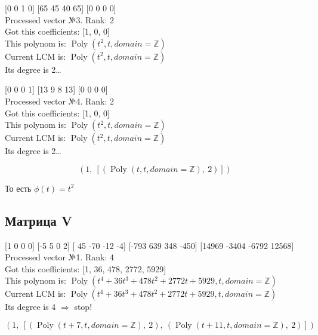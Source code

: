 \documentclass[12pt, a4paper]{article}
\begin{document}
    [0 0 1 0] [65 45 40 65] [0 0 0 0] \\
    Processed vector №3. Rank: 2\\
    Got this coefficients: [1, 0, 0]\\
    This polynom is: $\operatorname{Poly}{\left( t^{2}, t, domain=\mathbb{Z} \right)}$\\
    Current LCM is: $\operatorname{Poly}{\left( t^{2}, t, domain=\mathbb{Z} \right)}$\\
    Its degree is 2…

    [0 0 0 1] [13  9  8 13] [0 0 0 0] \\
    Processed vector №4. Rank: 2\\
    Got this coefficients: [1, 0, 0]\\
    This polynom is: $\operatorname{Poly}{\left( t^{2}, t, domain=\mathbb{Z} \right)}$\\
    Current LCM is: $\operatorname{Poly}{\left( t^{2}, t, domain=\mathbb{Z} \right)}$\\
    Its degree is 2…

    \begin{equation}\left( 1, \  \left[ \left( \operatorname{Poly}{\left( t, t, domain=\mathbb{Z} \right)}, \  2\right)\right]\right)\end{equation}

    То есть $\phi(t) = t^2$

    \subsection{Матрица V}

    [1 0 0 0] [-5  5  0  2] [ 45 -70 -12  -4] [-793  639  348 -450] [14969 -3404 -6792 12568] \\
    Processed vector №1. Rank: 4\\
    Got this coefficients: [1, 36, 478, 2772, 5929]\\
    This polynom is: $\operatorname{Poly}{\left( t^{4} + 36 t^{3} + 478 t^{2} + 2772 t + 5929, t, domain=\mathbb{Z} \right)}$\\
    Current LCM is: $\operatorname{Poly}{\left( t^{4} + 36 t^{3} + 478 t^{2} + 2772 t + 5929, t, domain=\mathbb{Z} \right)}$\\
    Its degree is 4 $\Rightarrow$ stop!

    \begin{equation}\left( 1, \  \left[ \left( \operatorname{Poly}{\left( t + 7, t, domain=\mathbb{Z} \right)}, \  2\right), \  \left( \operatorname{Poly}{\left( t + 11, t, domain=\mathbb{Z} \right)}, \  2\right)\right]\right)\end{equation}
\end{document}
